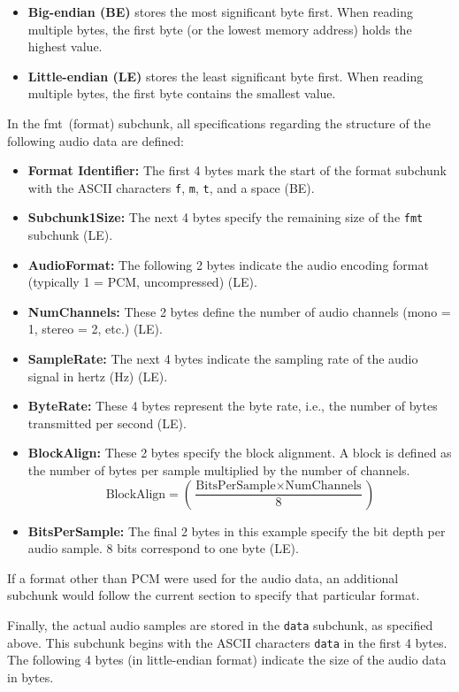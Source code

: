 \begin{itemize}
	\item \textbf{Big-endian (BE)} stores the most significant byte first. When reading multiple bytes, the first byte (or the lowest memory address) holds the highest value.
	\item \textbf{Little-endian (LE)} stores the least significant byte first. When reading multiple bytes, the first byte contains the smallest value.
\end{itemize}

In the \glqq fmt\grqq~(format) subchunk, all specifications regarding the structure of the following audio data are defined:

\begin{itemize}
	\item \textbf{Format Identifier:} The first 4 bytes mark the start of the format subchunk with the ASCII characters \texttt{f}, \texttt{m}, \texttt{t}, and a space (BE).
	\item \textbf{Subchunk1Size:} The next 4 bytes specify the remaining size of the \texttt{fmt} subchunk (LE).
	\item \textbf{AudioFormat:} The following 2 bytes indicate the audio encoding format (typically 1 = PCM, uncompressed) (LE).
	\item \textbf{NumChannels:} These 2 bytes define the number of audio channels (mono = 1, stereo = 2, etc.) (LE).
	\item \textbf{SampleRate:} The next 4 bytes indicate the sampling rate of the audio signal in hertz (Hz) (LE).
	\item \textbf{ByteRate:} These 4 bytes represent the byte rate, i.e., the number of bytes transmitted per second (LE).
	\item \textbf{BlockAlign:} These 2 bytes specify the block alignment. A block is defined as the number of bytes per sample multiplied by the number of channels.  
	\[
	\text{BlockAlign} = \left(\frac{\text{BitsPerSample} \times \text{NumChannels}}{8}\right)
	\]
	\item \textbf{BitsPerSample:} The final 2 bytes in this example specify the bit depth per audio sample. 8 bits correspond to one byte (LE).
\end{itemize}


If a format other than PCM were used for the audio data, an additional subchunk would follow the current section to specify that particular format.  
\bigskip

Finally, the actual audio samples are stored in the \texttt{data} subchunk, as specified above.  
This subchunk begins with the ASCII characters \texttt{data} in the first 4 bytes.  
The following 4 bytes (in little-endian format) indicate the size of the audio data in bytes.


